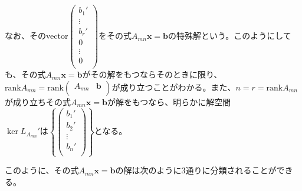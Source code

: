 \documentclass[dvipdfmx]{jsarticle}
\begin{document}
なお、そのvector$\begin{pmatrix}
b_{1}' \\
 \vdots \\
b_{r}' \\
0 \\
 \vdots \\
0 \\
\end{pmatrix}$をその式$A_{mn}\mathbf{x} = \mathbf{b}$の特殊解という。このようにしても、その式$A_{mn}\mathbf{x} = \mathbf{b}$がその解をもつならそのときに限り、${\mathrm{rank}}A_{mn} = {\mathrm{rank}}\begin{pmatrix}
A_{mn} & \mathbf{b} \\
\end{pmatrix}$が成り立つことがわかる。また、$n = r = {\mathrm{rank}}A_{mn}$が成り立ちその式$A_{mn}\mathbf{x} = \mathbf{b}$が解をもつなら、明らかに解空間$\ker L_{A_{mn}}'は\left\{ \begin{pmatrix}
b_{1}' \\
b_{2}' \\
 \vdots \\
b_{n}' \\
\end{pmatrix} \right\}$となる。\par
このように、その式$A_{mn}\mathbf{x} = \mathbf{b}$の解は次のように3通りに分類されることができる。
\end{document}
